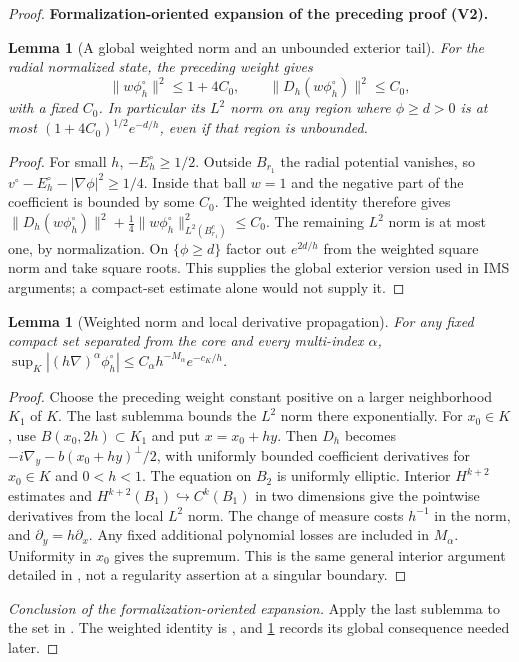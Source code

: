 \documentclass[11pt]{article}
\newtheorem{lemma}[theorem]{Lemma}
\newcommand{\formalisationparentid}{X}
\newenvironment{formalisationaddition}[1]{\par\medskip\begingroup\color{blue}\def\formalisationparentid{#1}\setcounter{formalizationsublemma}{0}\let\lemma\formalizationsublemma\let\endlemma\endformalizationsublemma
  \def\Eo{\mathcal E_h^\circ}\def\EE{\mathcal E_h}\def\phio{\phi_h^\circ}\def\phih{\phi_h}\def\Ho{H_h^{\rm atom}(v^\circ)}\def\Ha{H_h^{\rm atom}}\def\HL{H_h^{L}}\def\Dh{D_h}\def\Log{\operatorname{Log}}\def\ellh{\ell_h}\def\Gp{G_{p,h}}\def\Ast{A_{*,h}}\def\ahat{\widehat{\mathfrak a}_h}\def\ah{\mathfrak a_h}\def\rh{\widehat\rho_h}\def\deltah{\widehat\delta_h}\def\oldref##1{\textup{(##1)}}\def\interface##1{\par\noindent\textit{Analytical interface used here.} ##1\par}\def\finish{\par\noindent\textit{Conclusion of the formalization-oriented expansion.} }\par\noindent\textbf{Formalization-oriented expansion of the preceding proof (V2).}\par\smallskip
}{\par\endgroup\medskip
}
\begin{document}
\begin{proof}
\begin{formalisationaddition}{L2.5}
\begin{lemma}[A global weighted norm and an unbounded exterior tail]\label{sublemma:L2-5-global-tail}
For the radial normalized state, the preceding weight gives
\[
 \|w\phio\|^2\le1+4C_0,\qquad \|D_h(w\phio)\|^2\le C_0,
\]
with a fixed $C_0$. In particular its $L^2$ norm on any region where
$\phi\ge d>0$ is at most $(1+4C_0)^{1/2}e^{-d/h}$, even if that region
is unbounded.
\end{lemma}
\begin{proof}
For small $h$, $-E_h^\circ\ge1/2$. Outside $B_{r_1}$ the radial potential
vanishes, so $v^\circ-E_h^\circ-|\nabla\phi|^2\ge1/4$.
Inside that ball $w=1$ and the negative part of the coefficient is bounded
by some $C_0$. The weighted identity therefore gives
$\|D_h(w\phio)\|^2+\frac14\|w\phio\|_{L^2(B_{r_1}^c)}^2\le C_0$.
The remaining $L^2$ norm is at most one, by normalization. On
$\{\phi\ge d\}$ factor out $e^{2d/h}$ from the weighted square norm and
take square roots. This supplies the global exterior version used in IMS
arguments; a compact-set estimate alone would not supply it.
\end{proof}

\begin{lemma}[Weighted norm and local derivative propagation]\label{sublemma:L2-5-decay}
For any fixed compact set separated from the core and every multi-index
$\alpha$,
$\sup_K|(h\nabla)^\alpha\phio|\le C_\alpha h^{-M_\alpha}e^{-c_K/h}$.
\end{lemma}
\begin{proof}
Choose the preceding weight constant positive on a larger neighborhood
$K_1$ of $K$. The last sublemma bounds the $L^2$ norm there exponentially.
For $x_0\in K$, use $B(x_0,2h)\subset K_1$ and put $x=x_0+hy$.
Then $D_h$ becomes $-i\nabla_y-b(x_0+hy)^\perp/2$, with uniformly
bounded coefficient derivatives for $x_0\in K$ and $0<h<1$.
The equation on $B_2$ is uniformly elliptic. Interior $H^{k+2}$ estimates
and $H^{k+2}(B_1)\hookrightarrow C^k(B_1)$ in two dimensions give the
pointwise derivatives from the local $L^2$ norm. The change of measure
costs $h^{-1}$ in the norm, and $\partial_y=h\partial_x$.
Any fixed additional polynomial losses are included in $M_\alpha$.
Uniformity in $x_0$ gives the supremum. This is the same general interior
argument detailed in ,
not a regularity assertion at a singular boundary.
\end{proof}
\finish Apply the last sublemma to the set in .
The weighted identity is , and
\ref{sublemma:L2-5-global-tail} records its global consequence needed later.
\end{formalisationaddition}

\end{proof}
\end{document}
